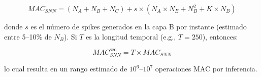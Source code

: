\begin{equation}
    MAC_{SNN} = (N_A + N_B + N_C) + s \times (N_A \times N_B + N_B^2 + K \times N_B)
\end{equation}

donde $s$ es el número de spikes generados en la capa B por instante (estimado entre 5--10\% de $N_B$). Si $T$ es la longitud temporal (e.g., $T = 250$), entonces:

\begin{equation}
    MAC^{\text{seq}}_{SNN} = T \times MAC_{SNN}
\end{equation}

lo cual resulta en un rango estimado de $10^6$--$10^7$ operaciones MAC por inferencia.



    
    



